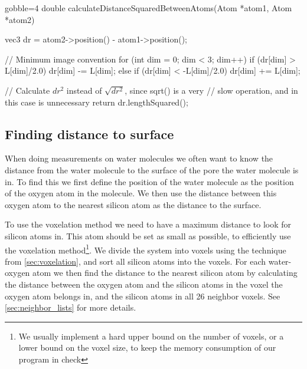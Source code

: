 \begin{listing}[!htb]%
\begin{cppcode*}{gobble=4}
    double calculateDistanceSquaredBetweenAtoms(Atom *atom1, Atom *atom2) {
        vec3 dr = atom2->position() - atom1->position();
        
        // Minimum image convention
        for (int dim = 0; dim < 3; dim++) {
            if      (dr[dim] >  L[dim]/2.0) dr[dim] -= L[dim];
            else if (dr[dim] < -L[dim]/2.0) dr[dim] += L[dim];
        }
        
        // Calculate $dr^2$ instead of $\sqrt{dr^2}$, since sqrt() is a very 
        // slow operation, and in this case is unnecessary
        return dr.lengthSquared();
    }
\end{cppcode*}
\caption{%
    Example implementation of \texttt{calculateDistanceSquaredBetweenAtoms} from \cref{list:findAtomsWithinRadius}.%
    \label{list:calculateDistanceSquaredBetweenAtoms}%
}%
\end{listing}%

\subsection{Finding distance to surface\label{sec:find_distance_to_surface}}
When doing measurements on water molecules we often want to know the distance from the water molecule to the surface of the pore the water molecule is in. To find this we first define the position of the water molecule as the position of the oxygen atom in the molecule. We then use the distance between this oxygen atom to the nearest silicon atom as the distance to the surface.

To use the voxelation method we need to have a maximum distance to look for silicon atoms in. This atom should be set as small as possible, to efficiently use the voxelation method\footnote{We usually implement a hard upper bound on the number of voxels, or a lower bound on the voxel size, to keep the memory consumption of our program in check}. We divide the system into voxels using the technique from \cref{sec:voxelation}, and sort all silicon atoms into the voxels. For each water-oxygen atom we then find the distance to the nearest silicon atom by calculating the distance between the oxygen atom and the silicon atoms in the voxel the oxygen atom belongs in, and the silicon atoms in all 26 neighbor voxels. See \cref{sec:neighbor_lists} for more details.


